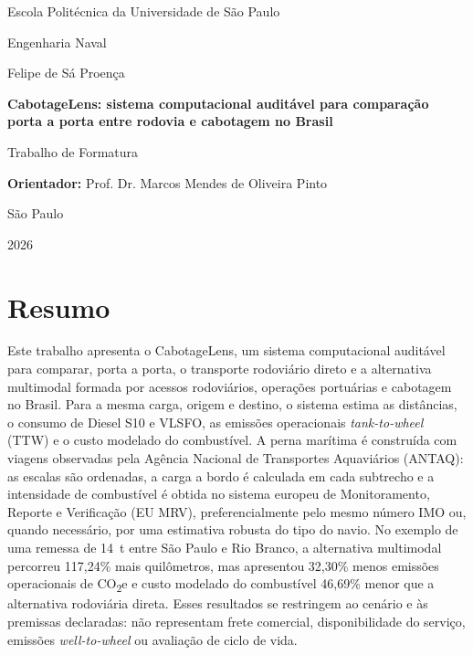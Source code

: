 \documentclass[brazil,]{article}
\let\oldsection\section
\renewcommand{\section}{\Needspace{14\baselineskip}\oldsection}
\newcommand{\reporttitle}{CabotageLens: sistema computacional auditável para comparação porta a porta entre rodovia e cabotagem no Brasil}
\newcommand{\reportauthor}{Felipe de Sá Proença}
\newcommand{\reportadvisor}{Prof. Dr. Marcos Mendes de Oliveira Pinto}
\newcommand{\reportinstitution}{Escola Politécnica da Universidade de São Paulo}
\newcommand{\reportcourse}{Engenharia Naval}
\newcommand{\reportlocation}{São Paulo}
\newcommand{\reportyear}{2026}
\begin{document}
\begin{titlepage}
\thispagestyle{empty}
\centering

{\large\reportinstitution\par}
\vspace{0.4cm}
{\large\reportcourse\par}

\vfill

{\Large\reportauthor\par}

\vfill

{\LARGE\bfseries\color{clblue}\reporttitle\par}

\vfill

{\large Trabalho de Formatura\par}
\vspace{0.5cm}
{\large\textbf{Orientador:} \reportadvisor\par}

\vfill

{\large\reportlocation\par}
{\large\reportyear\par}
\end{titlepage}

\section*{Resumo}

Este trabalho apresenta o CabotageLens, um sistema computacional auditável
para comparar, porta a porta, o transporte rodoviário direto e a alternativa
multimodal formada por acessos rodoviários, operações portuárias e cabotagem
no Brasil. Para a mesma carga, origem e destino, o sistema estima as
distâncias, o consumo de Diesel S10 e VLSFO, as emissões operacionais
\emph{tank-to-wheel} (TTW) e o custo modelado do combustível. A perna
marítima é construída com viagens observadas pela Agência Nacional de
Transportes Aquaviários (ANTAQ): as escalas são ordenadas, a carga a bordo é
calculada em cada subtrecho e a intensidade de combustível é obtida no
sistema europeu de Monitoramento, Reporte e Verificação (EU MRV),
preferencialmente pelo mesmo número IMO ou, quando necessário, por uma
estimativa robusta do tipo do navio. No exemplo de uma remessa de 14~t entre
São Paulo e Rio Branco, a alternativa multimodal percorreu 117,24\% mais
quilômetros, mas apresentou 32,30\% menos emissões operacionais de
CO\textsubscript{2}e e custo modelado do combustível 46,69\% menor que a
alternativa rodoviária direta. Esses resultados se restringem ao cenário e
às premissas declaradas: não representam frete comercial, disponibilidade
do serviço, emissões \emph{well-to-wheel} ou avaliação de ciclo de vida.
\end{document}
